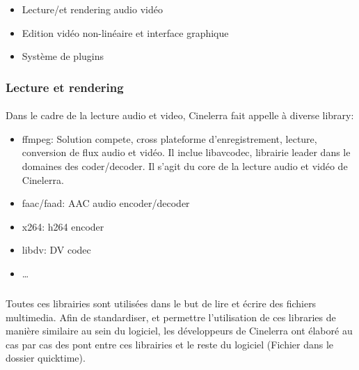 \begin{itemize}

  \item{Lecture/et rendering audio vidéo}

  \item{Edition vidéo non-linéaire et interface graphique}

  \item{Système de plugins}

\end{itemize}

\subsubsection{Lecture et rendering}

\paragraph{}

Dans le cadre de la lecture audio et video, Cinelerra fait appelle à
diverse library:

\begin{itemize}

  \item{ffmpeg: Solution compete, cross plateforme
  d'enregistrement, lecture, conversion de flux audio et vidéo. Il
  inclue libavcodec, librairie leader dans le domaines des
  coder/decoder.
Il s'agit du core de la
  lecture audio et vidéo de Cinelerra.}

  \item{faac/faad: AAC audio encoder/decoder}

  \item{x264: h264 encoder}

  \item{libdv: DV codec}

  \item{\ldots}

\end{itemize}

\subparagraph{}

Toutes ces librairies sont utilisées dans le but de lire et écrire des
fichiers multimedia. Afin de standardiser, et permettre l'utilisation de
ces libraries de manière similaire au sein du logiciel, les développeurs
de Cinelerra ont élaboré au cas par cas des pont entre ces librairies
et le reste du logiciel (Fichier dans le dossier quicktime).

